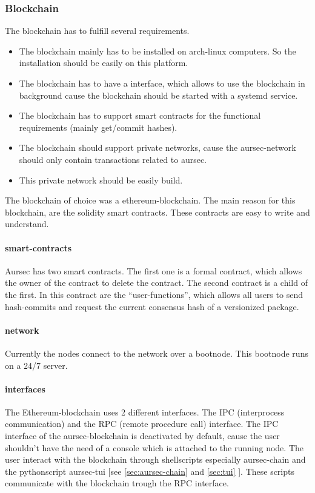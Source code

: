 \subsubsection{Blockchain} \label{sec:blockchain}
The blockchain has to fulfill several requirements. %
\begin{itemize}
	\item The blockchain mainly has to be installed on arch-linux computers. So the installation should be easily on this platform.
	\item The blockchain has to have a interface, which allows to use the blockchain in background cause the blockchain should be started with a systemd service.
	\item The blockchain has to support smart contracts for the functional requirements (mainly get/commit hashes).
	\item The blockchain should support private networks, cause the aursec-network should only contain transactions related to aursec.
	\item This private network should be easily build.
\end{itemize}

The blockchain of choice was a ethereum-blockchain. The main reason for this blockchain, are the solidity smart contracts. These contracts are easy to write and understand. 

\paragraph*{smart-contracts}
Aursec has two smart contracts. The first one is a formal contract, which allows the owner of the contract to delete the contract. The second contract is a child of the first. In this contract are the ``user-functions'', which allows all users to send hash-commits and request the current consensus hash of a versionized package. 

\paragraph*{network}
Currently the nodes connect to the network over a bootnode. This bootnode runs on a 24/7 server.

\paragraph*{interfaces}
The Ethereum-blockchain uses 2 different interfaces. The IPC (interprocess communication) and the RPC (remote procedure call) interface. The IPC interface of the aursec-blockchain is deactivated by default, cause the user shouldn't have the need of a console which is attached to the running node. The user interact with the blockchain through shellscripts especially aursec-chain and the pythonscript aursec-tui [see \ref{sec:aursec-chain} and \ref{sec:tui} ]. These scripts communicate with the blockchain trough the RPC interface. 